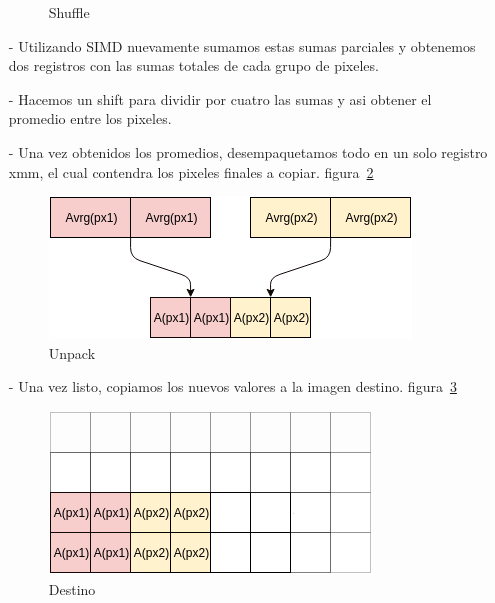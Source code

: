 \documentclass[a4paper]{article}
\begin{document}
\begin{itemize}
\begin{figure}[!htb]
\begin{center}
        	\caption{Shuffle}
        	\label{shufflePixeles}
          \end{center}
        \end{figure}
    \item[-]
        Utilizando SIMD nuevamente sumamos estas sumas parciales y obtenemos dos registros con las sumas totales de cada grupo de pixeles.
    \item[-]
        Hacemos un shift para dividir por cuatro las sumas y asi obtener el promedio entre los pixeles.
    \item[-]
        Una vez obtenidos los promedios, desempaquetamos todo en un solo registro xmm, el cual contendra los pixeles finales a copiar. figura~\ref{unpackPixeles}
        \begin{figure}[!htb]
          \begin{center}
        	\includegraphics[scale=0.75]{imagenes/diagramas/pixelar/unpackPixeles.png}
        	\caption{Unpack}
        	\label{unpackPixeles}
          \end{center}
        \end{figure}
        \newpage
    \item[-]
        Una vez listo, copiamos los nuevos valores a la imagen destino. figura~\ref{destPixeles}
        \begin{figure}[!htb]
          \begin{center}
        	\includegraphics[scale=0.75]{imagenes/diagramas/pixelar/destPixeles.png}
        	\caption{Destino}
        	\label{destPixeles}
          \end{center}
        \end{figure}
\end{itemize}
\end{document}
